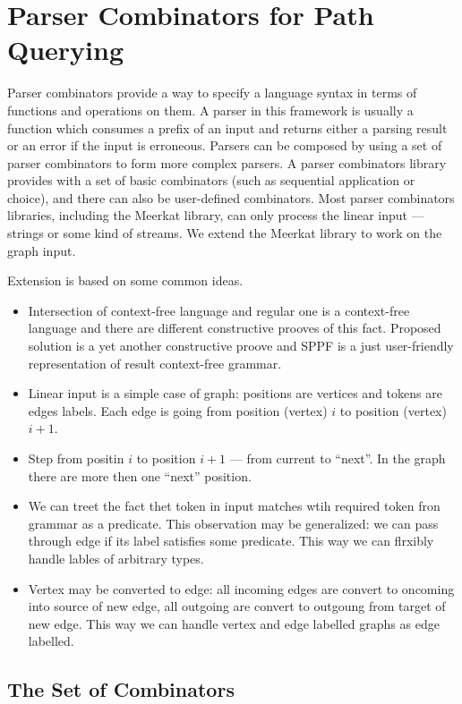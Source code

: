  \section{Parser Combinators for Path Querying}

Parser combinators provide a way to specify a language syntax in terms of functions and operations on them. 
A parser in this framework is usually a function which consumes a prefix of an input and returns either a parsing result or an error if the input is erroneous. 
Parsers can be composed by using a set of parser combinators to form more complex parsers. 
A parser combinators library provides with a set of basic combinators (such as sequential application or choice), and there can also be user-defined combinators. 
Most parser combinators libraries, including the Meerkat library, can only process the linear input --- strings or some kind of streams. 
We extend the Meerkat library to work on the graph input.

Extension is based on some common ideas.
\begin{itemize}
\item Intersection of context-free language and regular one is a context-free language and there are different constructive prooves of this fact.
Proposed solution is a yet another constructive proove and SPPF is a just user-friendly representation of result context-free grammar.
\item Linear input is a simple case of graph: positions are vertices and tokens are edges labels.
Each edge is going from position (vertex) $i$ to position (vertex) $i+1$.
\item Step from positin $i$ to position $i+1$ --- from current to ``next''.
In the graph there are more then one ``next'' position. 
\item We can treet the fact thet token in input matches wtih required token fron grammar as a predicate.
This observation may be generalized: we can pass through  edge if its label satisfies some predicate.
This way we can flrxibly handle lables of arbitrary types.
\item Vertex may be converted to edge: all incoming edges are convert to oncoming into source of new edge, all outgoing are convert to outgoung from target of new edge.
This way we can handle vertex and edge labelled graphs as edge labelled.
\end{itemize}


\subsection{The Set of Combinators}

